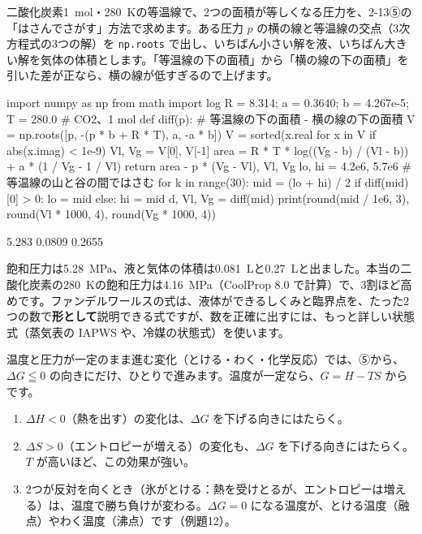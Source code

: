 二酸化炭素\qty{1}{mol}・\qty{280}{K}の等温線で、2つの面積が等しくなる圧力を、2-13⑤の「はさんでさがす」方法で求めます。ある圧力 $p$ の横の線と等温線の交点（3次方程式の3つの解）を \texttt{np.roots} で出し、いちばん小さい解を液、いちばん大きい解を気体の体積とします。「等温線の下の面積」から「横の線の下の面積」を引いた差が正なら、横の線が低すぎるので上げます。
\begin{phcode}
import numpy as np
from math import log
R = 8.314; a = 0.3640; b = 4.267e-5; T = 280.0   \# CO2、1 mol
def diff(p):              \# 等温線の下の面積 - 横の線の下の面積
    V = np.roots([p, -(p * b + R * T), a, -a * b])
    V = sorted(x.real for x in V if abs(x.imag) < 1e-9)
    Vl, Vg = V[0], V[-1]
    area = R * T * log((Vg - b) / (Vl - b)) + a * (1 / Vg - 1 / Vl)
    return area - p * (Vg - Vl), Vl, Vg
lo, hi = 4.2e6, 5.7e6     \# 等温線の山と谷の間ではさむ
for k in range(30):
    mid = (lo + hi) / 2
    if diff(mid)[0] > 0: lo = mid
    else: hi = mid
d, Vl, Vg = diff(mid)
print(round(mid / 1e6, 3), round(Vl * 1000, 4), round(Vg * 1000, 4))
\end{phcode}
\begin{phcodeout}
5.283 0.0809 0.2655
\end{phcodeout}
飽和圧力は\qty{5.28}{MPa}、液と気体の体積は\qty{0.081}{L}と\qty{0.27}{L}と出ました。本当の二酸化炭素の\qty{280}{K}の飽和圧力は\qty{4.16}{MPa}（CoolProp 8.0 で計算）で、3割ほど高めです。ファンデルワールスの式は、液体ができるしくみと臨界点を、たった2つの数で\textbf{形として}説明できる式ですが、数を正確に出すには、もっと詳しい状態式（蒸気表の IAPWS や、冷媒の状態式）を使います。

\label{ph:熱-10:sec9}
温度と圧力が一定のまま進む変化（とける・わく・化学反応）では、⑤から、$\Delta G\leqq0$ の向きにだけ、ひとりで進みます。温度が一定なら、$G=H-TS$ から
です。
\begin{enumerate}[label={\bkcircled{\arabic*}}, leftmargin=2.4\zw, itemsep=1pt, topsep=2pt]
\item $\Delta H<0$（熱を出す）の変化は、$\Delta G$ を下げる向きにはたらく。
\item $\Delta S>0$（エントロピーが増える）の変化も、$\Delta G$ を下げる向きにはたらく。$T$ が高いほど、この効果が強い。
\item 2つが反対を向くとき（氷がとける：熱を受けとるが、エントロピーは増える）は、温度で勝ち負けが変わる。$\Delta G=0$ になる温度が、とける温度（融点）やわく温度（沸点）です（例題12）。
\end{enumerate}


